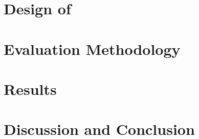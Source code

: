 \section{Design of \parlot}
\label{sec:ch2_design}


\section{Evaluation Methodology}
\label{sec:ch2_evalmeth}


\section{Results}
\label{sec:ch2_results}


\section{Discussion and Conclusion}
\label{sec:ch2_concl}

